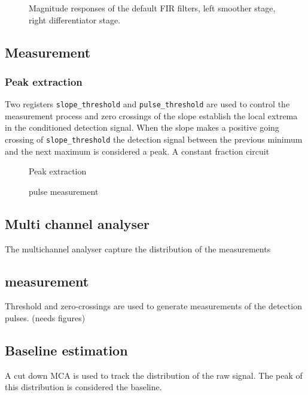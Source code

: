 \documentclass{article}
\newcommand{\code}[1]{\texttt{#1}}
\begin{document}
\begin{figure}[!hpbt]
  \centering
  
  \caption{
    Magnitude responses of the default FIR filters, left smoother stage, right
    differentiator stage.}
  \label{fig:filterresps}
\end{figure}

\clearpage

\subsection{Measurement}
\subsubsection{Peak extraction}
Two registers \code{slope\_threshold} and \code{pulse\_threshold} are used to
control the measurement process and zero crossings of the slope establish the
local extrema in the conditioned detection signal.
When the slope makes a positive going crossing of \code{slope\_threshold} the
detection signal between the previous minimum and the next maximum is
considered a peak. A constant fraction circuit 


\begin{figure}[!hpbt]
  \centering
  
  \caption{
    Peak extraction
  }
  \label{fig:peakextraction}
\end{figure}

\begin{figure}[!hpbt]
  \centering
  
  \caption{
    pulse measurement
  }
  \label{fig:pulsemeasurement}
\end{figure}
\subsection{Multi channel analyser}
The multichannel analyser capture the distribution of the measurements
\subsection{measurement}
Threshold and zero-crossings are used to generate measurements of the detection
pulses. (needs figures)
\subsection{Baseline estimation}
A cut down MCA is used to track the distribution of the raw signal. The peak of
this distribution is considered the baseline. 
\end{document}
